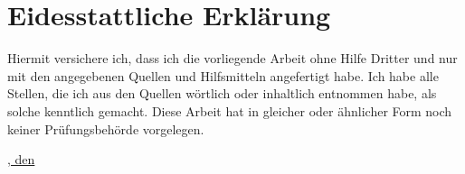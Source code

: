 \chapter*{Eidesstattliche Erklärung}
\label{chap:declaration}

Hiermit versichere ich, dass ich die vorliegende Arbeit ohne Hilfe Dritter und nur mit den angegebenen Quellen und Hilfsmitteln angefertigt habe. Ich habe alle Stellen, die ich aus den Quellen wörtlich oder inhaltlich entnommen habe, als solche kenntlich gemacht. Diese Arbeit hat in gleicher oder ähnlicher Form noch keiner Prüfungsbehörde vorgelegen.
\vspace*{1cm}
\begin{flushright}\small \underline{\documentLocation, den \documentDate \hspace{0.4\textwidth}}\end{flushright}